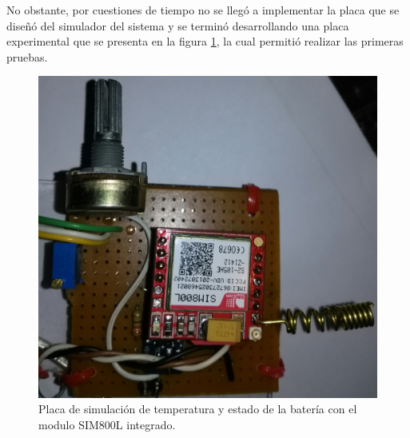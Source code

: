 No obstante, por cuestiones de tiempo no se llegó a implementar la placa que se diseñó del simulador del sistema y se terminó desarrollando una placa experimental que se presenta en la figura \ref{fig:placa_básicafirst}, la cual permitió realizar las primeras pruebas.

\begin{figure}[!ht]
  \centering
  \includegraphics[scale=.07]{./Figures/placa_basica.jpg}
  \caption{Placa de simulación de temperatura y estado de la batería con el modulo SIM800L integrado.}
  \label{fig:placa_básicafirst}
\end{figure}


%




